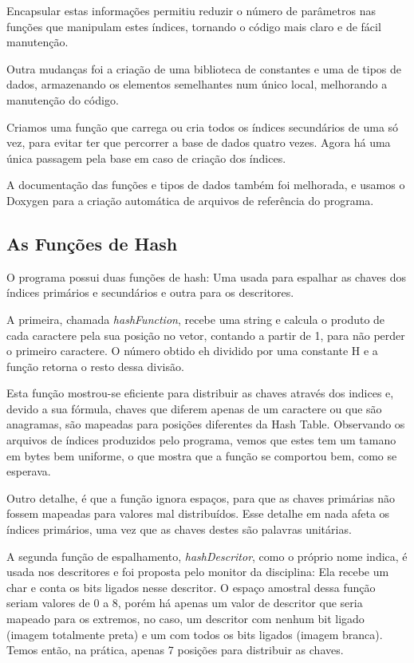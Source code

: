 \documentclass[10pt,a4paper,draft]{article}
\begin{document}
Encapsular estas informações permitiu reduzir o número de parâmetros nas
funções que manipulam estes índices, tornando o código mais claro e de fácil
manutenção.

Outra mudanças foi a criação de uma biblioteca de constantes e uma de tipos de
dados, armazenando os elementos semelhantes num único local, melhorando a
manutenção do código.

Criamos uma função que carrega ou cria todos os índices secundários de uma só
vez, para evitar ter que percorrer a base de dados quatro vezes. Agora há uma
única passagem pela base em caso de criação dos índices.

A documentação das funções e tipos de dados também foi melhorada, e usamos o
Doxygen para a criação automática de arquivos de referência do programa.

\subsection{As Funções de Hash}
O programa possui duas funções de hash: Uma usada para espalhar as chaves dos índices 
primários e secundários e outra para os descritores.

A primeira, chamada \textit{hashFunction}, recebe uma string e calcula o produto de cada caractere pela sua posição no vetor, contando a partir de 1, para não perder o primeiro caractere. O número obtido eh dividido por uma constante H e a função retorna o resto dessa divisão.

Esta função mostrou-se eficiente para distribuir as chaves através dos indices e, devido a sua fórmula, chaves que diferem apenas de um caractere ou que são anagramas, são mapeadas para posições diferentes da Hash Table. Observando os arquivos de índices produzidos pelo programa, vemos que estes tem um tamano em bytes bem uniforme, o que mostra que a função se comportou bem, como se esperava.

Outro detalhe, é que a função ignora espaços, para que as chaves primárias não fossem mapeadas para valores mal distribuídos. Esse detalhe em nada afeta os índices primários, uma vez que as chaves destes são palavras unitárias.

A segunda função de espalhamento, \textit{hashDescritor}, como o próprio nome indica, é usada nos descritores e foi proposta pelo monitor da disciplina: Ela recebe um char e conta os bits ligados nesse descritor. O espaço amostral dessa função seriam valores de 0 a 8, porém há apenas um valor de descritor que seria mapeado para os extremos, no caso, um descritor com nenhum bit ligado (imagem totalmente preta) e um com todos os bits ligados (imagem branca). Temos então, na prática, apenas 7 posições para distribuir as chaves.
\end{document}
